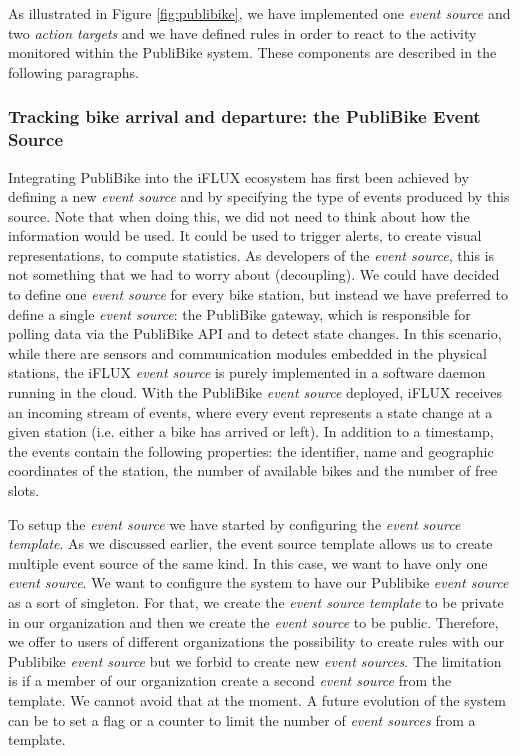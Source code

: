 As illustrated in Figure \ref{fig:publibike}, we have implemented one \emph{event source} and two \emph{action targets} and we have defined rules in order to react to the activity monitored within the PubliBike system. These components are described in the following paragraphs.

\subsubsection{Tracking bike arrival and departure: the PubliBike Event Source}
Integrating PubliBike into the iFLUX ecosystem has first been achieved by defining a new \emph{event source} and by specifying the type of events produced by this source. Note that when doing this, we did not need to think about how the information would be used. It could be used to trigger alerts, to create visual representations, to compute statistics. As developers of the \emph{event source}, this is not something that we had to worry about (decoupling). We could have decided to define one \emph{event source} for every bike station, but instead we have preferred to define a single \emph{event source}: the PubliBike gateway, which is responsible for polling data via the PubliBike API and to detect state changes. In this scenario, while there are sensors and communication modules embedded in the physical stations, the iFLUX \emph{event source} is purely implemented in a software daemon running in the cloud. With the PubliBike \emph{event source} deployed, iFLUX receives an incoming stream of events, where every event represents a state change at a given station (i.e. either a bike has arrived or left). In addition to a timestamp, the events contain the following properties: the identifier, name and geographic coordinates of the station, the number of available bikes and the number of free slots. 

To setup the \emph{event source} we have started by configuring the \emph{event source template}. As we discussed earlier, the event source template allows us to create multiple event source of the same kind. In this case, we want to have only one \emph{event source}. We want to configure the system to have our Publibike \emph{event source} as a sort of singleton. For that, we create the \emph{event source template} to be private in our organization and then we create the \emph{event source} to be public. Therefore, we offer to users of different organizations the possibility to create rules with our Publibike \emph{event source} but we forbid to create new \emph{event sources}. The limitation is if a member of our organization create a second \emph{event source} from the template. We cannot avoid that at the moment. A future evolution of the system can be to set a flag or a counter to limit the number of \emph{event sources} from a template.

